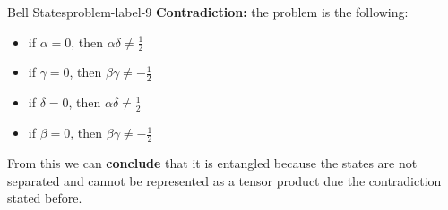 \begin{problem}{Bell States}{problem-label-9}
	\textbf{Contradiction:} the problem is the following:
	\begin{itemize}
		\item if $\alpha = 0$, then $\alpha\delta \not= \frac{1}{2}$
		\item if $\gamma = 0$, then $\beta\gamma \not= -\frac{1}{2}$
		\item if $\delta = 0$, then $\alpha\delta \not= \frac{1}{2}$
		\item if $\beta = 0$, then $\beta\gamma \not= -\frac{1}{2}$
	\end{itemize}
		
			From this we can \textbf{conclude} that it is entangled because the states are not separated and cannot be represented as a tensor product due the contradiction stated before.
\end{problem}

